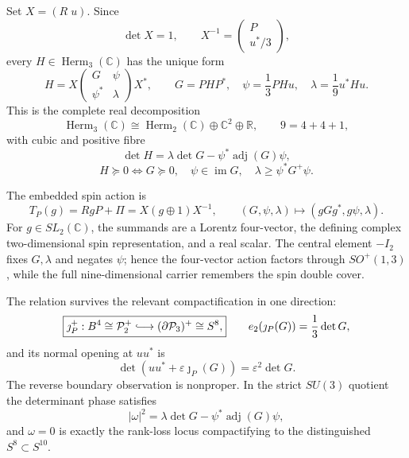 \documentclass[10pt,letterpaper]{article}
\begin{document}
Set \(X=(R\;u)\).  Since
\[
 \det X=1,\qquad X^{-1}=\begin{pmatrix}P\\u^*/3\end{pmatrix},
\]
every \(H\in\operatorname{Herm}_3(\mathbb C)\) has the unique form
\[
 H=X\begin{pmatrix}G&\psi\\\psi^*&\lambda\end{pmatrix}X^*,\qquad
 G=PHP^*,\quad\psi=\frac13PHu,\quad\lambda=\frac19u^*Hu.
\]
This is the complete real decomposition
\[
 \boxed{\operatorname{Herm}_3(\mathbb C)
 \cong\operatorname{Herm}_2(\mathbb C)\oplus\mathbb C^2\oplus\mathbb R,
 \qquad 9=4+4+1,}
\]
with cubic and positive fibre
\[
 \boxed{\det H=\lambda\det G-\psi^*\operatorname{adj}(G)\psi,}
\]
\[
 H\succeq0\Longleftrightarrow
 G\succeq0,\quad\psi\in\operatorname{im}G,\quad
 \lambda\geq\psi^*G^+\psi.
\]

The embedded spin action is
\[
 T_P(g)=RgP+\Pi=X(g\oplus1)X^{-1},\qquad
 (G,\psi,\lambda)\longmapsto(gGg^*,g\psi,\lambda).
\]
For \(g\in SL_2(\mathbb C)\), the summands are a Lorentz four-vector, the
defining complex two-dimensional spin representation, and a real scalar.
The central element \(-I_2\) fixes \(G,\lambda\) and negates \(\psi\);
hence the four-vector action factors through \(SO^+(1,3)\), while the full
nine-dimensional carrier remembers the spin double cover.

The relation survives the relevant compactification in one direction:
\[
 \boxed{\jmath_P^+:B^4\cong\mathcal P_2^+
 \lhook\joinrel\longrightarrow(\partial\mathcal P_3)^+\cong S^8,}
 \qquad e_2(\jmath_P(G))=\frac13\det G,
\]
and its normal opening at \(uu^*\) is
\[
 \boxed{\det(uu^*+\varepsilon\jmath_P(G))
 =\varepsilon^2\det G.}
\]
The reverse boundary observation is nonproper.  In the strict \(SU(3)\)
quotient the determinant phase satisfies
\[
 |\omega|^2=\lambda\det G-\psi^*\operatorname{adj}(G)\psi,
\]
and \(\omega=0\) is exactly the rank-loss locus compactifying to the
distinguished \(S^8\subset S^{10}\).
\end{document}
